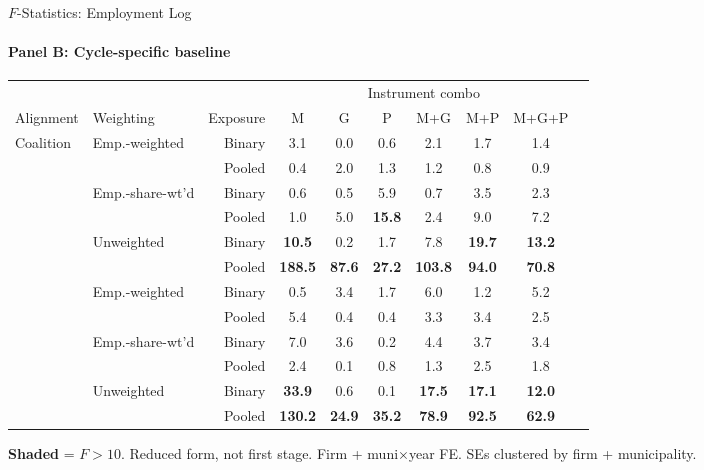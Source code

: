 \documentclass[aspectratio=169,10pt]{beamer}
\newcommand{\fpass}[1]{\cellcolor{pass}\textbf{#1}}
\begin{document}
\begin{frame}[t]{$F$-Statistics: Employment Log}
\framesubtitle{Panel B: Cycle-specific baseline}
\begin{center}
\footnotesize
\setlength{\tabcolsep}{3.5pt}
\renewcommand{\arraystretch}{1.05}
\begin{tabular}{@{}llrccccccc@{}}
\toprule
 & & & \multicolumn{6}{c}{Instrument combo} \\
\cmidrule(l{2pt}r{2pt}){4-9}
Alignment & Weighting & Exposure & M & G & P & M+G & M+P & M+G+P \\
\midrule
  \multirow{6}{*}{Coalition} & \multirow{2}{*}{Emp.-weighted} & Binary & 3.1 & 0.0 & 0.6 & 2.1 & 1.7 & 1.4 \\
   &  & Pooled & 0.4 & 2.0 & 1.3 & 1.2 & 0.8 & 0.9 \\
   & \multirow{2}{*}{Emp.-share-wt'd} & Binary & 0.6 & 0.5 & 5.9 & 0.7 & 3.5 & 2.3 \\
   &  & Pooled & 1.0 & 5.0 & \fpass{15.8} & 2.4 & 9.0 & 7.2 \\
   & \multirow{2}{*}{Unweighted} & Binary & \fpass{10.5} & 0.2 & 1.7 & 7.8 & \fpass{19.7} & \fpass{13.2} \\
   &  & Pooled & \fpass{188.5} & \fpass{87.6} & \fpass{27.2} & \fpass{103.8} & \fpass{94.0} & \fpass{70.8} \\
\addlinespace[5pt]
  \multirow{6}{*}{Party} & \multirow{2}{*}{Emp.-weighted} & Binary & 0.5 & 3.4 & 1.7 & 6.0 & 1.2 & 5.2 \\
   &  & Pooled & 5.4 & 0.4 & 0.4 & 3.3 & 3.4 & 2.5 \\
   & \multirow{2}{*}{Emp.-share-wt'd} & Binary & 7.0 & 3.6 & 0.2 & 4.4 & 3.7 & 3.4 \\
   &  & Pooled & 2.4 & 0.1 & 0.8 & 1.3 & 2.5 & 1.8 \\
   & \multirow{2}{*}{Unweighted} & Binary & \fpass{33.9} & 0.6 & 0.1 & \fpass{17.5} & \fpass{17.1} & \fpass{12.0} \\
   &  & Pooled & \fpass{130.2} & \fpass{24.9} & \fpass{35.2} & \fpass{78.9} & \fpass{92.5} & \fpass{62.9} \\
\bottomrule
\end{tabular}
\end{center}
{\scriptsize \colorbox{pass}{\textbf{Shaded}} = $F>10$. \textcolor{alertred}{Reduced form, not first stage.} Firm + muni$\times$year FE. SEs clustered by firm + municipality.}
\end{frame}
\end{document}
